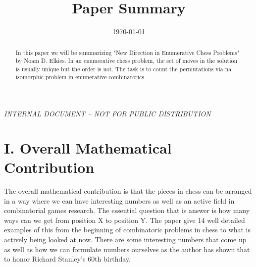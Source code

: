 \documentclass[aps,prl,twocolumn,showpacs,superscriptaddress,groupedaddress]{revtex4}  %
\begin{document}
\widetext
{}
\bigskip
\centerline{\em INTERNAL DOCUMENT -- NOT FOR PUBLIC DISTRIBUTION}


\title{Paper Summary}     %
\date{\today}


\begin{abstract}
In this paper we will be summarizing "New Direction in Enumerative Chess Problems" by Noam D. Elkies. In an enumerative chess problem, the set of moves in the solution is usually unique but the order is not. The task is to count the permutations via na isomorphic problem in enumerative combinatorics. 
\end{abstract}

\maketitle

\section{\label{sec: level1}I. Overall Mathematical Contribution}
The overall mathematical contribution is that the pieces in chess can be arranged in a way where we can have interesting numbers as well as an active field in combinatorial games research. The essential question that is answer is how many ways can we get from position X to position Y. The paper give 14 well detailed examples of this from the beginning of combinatoric problems in chess to what is actively being looked at now. There are some interesting numbers that come up as well as how we can formulate numbers ourselves as the author has shown that to honor Richard Stanley's 60th birthday. 
\end{document}
